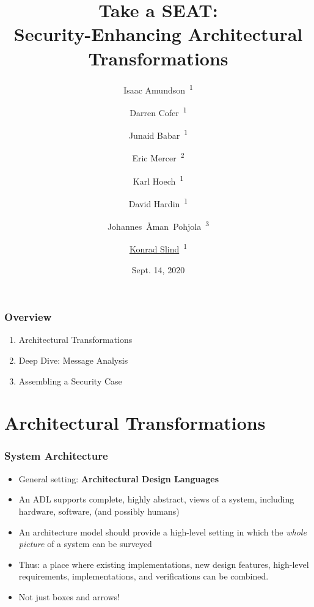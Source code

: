 \documentclass{beamer}
\begin{document}

\author{Isaac Amundson~\textsuperscript{1} \and %
Darren Cofer~\textsuperscript{1} \and %
Junaid Babar~\textsuperscript{1} \and %
Eric Mercer~\textsuperscript{2} \and %
Karl Hoech~\textsuperscript{1} \and %
David Hardin~\textsuperscript{1} \and %
Johannes~{\AA}man~Pohjola~\textsuperscript{3} \and %
\underline{Konrad Slind}~\textsuperscript{1}
}


\date{Sept. 14, 2020}
\title{Take a SEAT: \\ Security-Enhancing Architectural Transformations}
\maketitle

\begin{frame}\frametitle{Overview}

\begin{enumerate}
\item Architectural Transformations
\item Deep Dive: Message Analysis
\item Assembling a Security Case
\end{enumerate}
\end{frame}


\section {Architectural Transformations}

\begin{frame}\frametitle{System Architecture}
\begin{itemize}

\item General setting: \textbf{Architectural Design Languages}

\item An ADL supports complete, highly abstract, views of a system,
  including hardware, software, (and possibly humans)

\item An architecture model should provide a high-level setting in which
  the \emph{whole picture} of a system can be surveyed

\item Thus: a place where existing implementations, new design
  features, high-level requirements, implementations, and
  verifications can be combined.

\item Not just boxes and arrows!

\end{itemize}

\end{frame}
\end{document}
